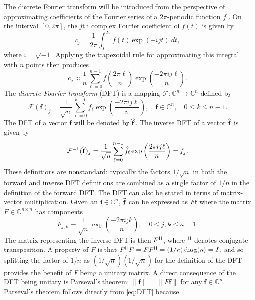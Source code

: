 The discrete Fourier transform will be introduced from the perspective of approximating coefficients of the Fourier series of a $2\pi$-periodic function $f$ \cite[p.~132-134]{BoggessNarcowich2009}. On the interval $[0,2\pi]$, the $j$th complex Fourier coefficient of $f(t)$ is given by
\[c_j = \frac{1}{2\pi}\int_0^{2\pi} f(t)\exp(-ijt)\:dt,\]
where $i = \sqrt{-1}$.  Applying the trapezoidal rule for approximating this integral with $n$ points then produces
\[c_j \approx \frac{1}{n}\sum_{\ell = 0}^{n-1} f\left(\frac{2\pi{\ell}}{n}\right)\exp\left(\frac{-2\pi{ij\ell}}{n}\right).\]
The \textit{discrete Fourier transform} (DFT) is a mapping $\mathcal{F}:\mathbb{C}^n \rightarrow \mathbb{C}^n$ defined by
\begin{equation}
\mathcal{F}(\mathbf{f})_j = \frac{1}{\sqrt{n}}\sum_{\ell=0}^{n-1} f_{\ell}\exp\left(\frac{-2\pi{ij\ell}}{n}\right), \quad \mathbf{f}\in\mathbb{C}^n, \quad 0 \leq k \leq n-1.
\label{eq:DFT}
\end{equation}
The DFT of a vector $\mathbf{f}$ will be denoted by $\widehat{\mathbf{f}}$. The inverse DFT of a vector $\widehat{\mathbf{f}}$ is given by
\begin{equation}
\mathcal{F}^{-1}(\widehat{\mathbf{f}})_j = \frac{1}{\sqrt{n}}\sum_{\ell=0}^{n-1} \widehat{f}_\ell\exp\left(\frac{2\pi{ij\ell}}{n}\right) = f_j.
\end{equation}
These definitions are nonstandard; typically the factors $1/\sqrt{n}$ in both the forward and inverse DFT definitions are combined as a single factor of $1/n$ in the definition of the forward DFT. The DFT can also be stated in terms of matrix-vector multiplication. Given an $\mathbf{f} \in \mathbb{C}^n$, $\widehat{\mathbf{f}}$ can be expressed as $F\mathbf{f}$ where the matrix $F\in\mathbb{C}^{n\times{n}}$ has components
\begin{equation}
F_{j,k} = \frac{1}{\sqrt{n}}\exp\left(\frac{-2\pi{ijk}}{n}\right), \quad 0 \leq j,k \leq n-1.
\label{eq:DFT-Matrix}
\end{equation}
The matrix representing the inverse DFT is then ${F}^\mathsf{H}$, where ${}^\mathsf{H}$ denotes conjugate transposition. A property of $F$ is that ${F}^\mathsf{H} F = F{F}^\mathsf{H} = (1/n)\operatorname{diag}(n) = I$, and so splitting the factor of $1/n$ as $(1/\sqrt{n})(1/\sqrt{n})$ for the definition of the DFT provides the benefit of $F$ being a unitary matrix. A direct consequence of the DFT being unitary is Parseval's theorem: $\|\mathbf{f}\| = \|F\mathbf{f}\|$ for any $\mathbf{f} \in \mathbb{C}^n$. Parseval's theorem follows directly from \eqref{eq:DFT} because
